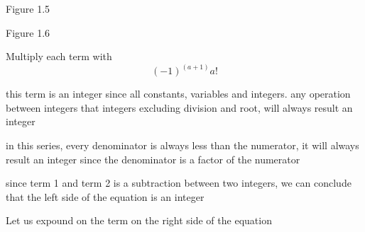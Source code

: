 \documentclass[12pt, a4paper]{article}
\begin{document}
\centering{\fontsize{17.28pt}{18pt}\selectfont
\[ e^{-1} = \frac{b}{a}= \sum_{k=0}^{a} \frac{(-1)^{k}}{k!} + \sum_{k = a + 1}^{\infty} \frac{(-1)^{k}}{k!}
\]
}

\raggedleft
{\small Figure 1.5}

\centering{\fontsize{17.28pt}{18pt}\selectfont
\[ \frac{b}{a} - \sum_{k = 0}^{a} \frac{(-1)^k}{k!} = \sum_{k = a + 1}^{\infty} \frac{(-1)^{k}}{k!}
\]
}
\raggedleft
{\small Figure 1.6}

\raggedright

Multiply each term with \[(-1)^{(a+1)}a!\]

\vspace{0.5cm}
\raggedright

this term is an integer since all constants, variables and integers. any operation between integers that integers
excluding division and root, will always result an integer


\raggedright

in this series, every denominator is always less than the numerator, it will always result
an integer since the denominator is a factor of the numerator

\centering{\fontsize{17.28pt}{18pt}\selectfont
\[
    \frac{a!}{b!} = c, s.t c \in \mathbb{Z}
\]

}


\vspace{1cm}
\raggedright

since term 1 and term 2 is a subtraction between two integers, we can conclude that the left
side of the equation is an integer

\centering{\fontsize{17.28pt}{18pt}\selectfont

\[
  \mathbb{Z} = \sum_{k = a + 1}^{\infty} \frac{(-1)^{k}}{k!}
\]

}

\vspace{1cm}
\raggedright

Let us expound on the term on the right side of the equation
\end{document}
